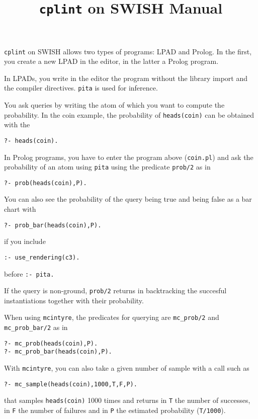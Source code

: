 \documentclass[a4paper,10pt]{article}
\begin{document}
\title{\texttt{cplint} on SWISH Manual}
\maketitle

%





\verb|cplint| on SWISH allows two types of programs: LPAD and Prolog. In the first, you create a new LPAD in the editor, in the latter a Prolog program. 

In LPADs, you write in the editor the program without the library import and the compiler directives. \verb|pita| is used for inference.

You ask queries by writing the atom of which you want to compute the probability. In the coin example, the probability of \verb|heads(coin)| can be obtained with the 
\begin{verbatim}
?- heads(coin).
\end{verbatim}

In Prolog programs, you have to enter the program above (\verb|coin.pl|) and ask the probability of an atom using \verb|pita| using the predicate \verb|prob/2| as in
\begin{verbatim}
?- prob(heads(coin),P).
\end{verbatim}
You can also see the probability of the query being true and 
being false as a bar chart with
\begin{verbatim}
?- prob_bar(heads(coin),P).
\end{verbatim}
if you include
\begin{verbatim}
:- use_rendering(c3).
\end{verbatim}
before \verb|:- pita.|

If the query is non-ground, \verb|prob/2| returns in backtracking the succesful instantiations together with their probability.

When using \verb|mcintyre|, the predicates for querying are \verb|mc_prob/2| and \verb|mc_prob_bar/2| as in
\begin{verbatim}
?- mc_prob(heads(coin),P).
?- mc_prob_bar(heads(coin),P).
\end{verbatim}
With \verb|mcintyre|, you can also take a given number of sample with a call such as
\begin{verbatim}
?- mc_sample(heads(coin),1000,T,F,P).
\end{verbatim}
that samples \verb|heads(coin)| 1000 times and returns in \verb|T| the number of successes, in \verb|F| the number of failures and in \verb|P| the
estimated probability (\verb|T/1000|).
\end{document}
